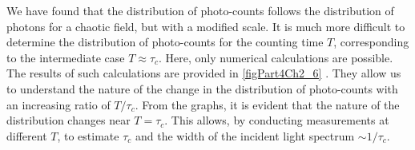 We have found that the distribution of photo-counts follows the distribution of photons for a chaotic field, but with a modified scale. It is much more difficult to determine the distribution of photo-counts for the counting time $T$, corresponding to the intermediate case $T \approx \tau_c$. Here, only numerical calculations are possible. The results of such calculations are provided in \autoref{figPart4Ch2_6} \cite{bLoudon1976}. They allow us to understand the nature of the change in the distribution of photo-counts with an increasing ratio of $T/\tau_c$. From the graphs, it is evident that the nature of the distribution changes near $T = \tau_c$. This allows, by conducting measurements at different $T$, to estimate $\tau_c$ and the width of the incident light spectrum $\sim 1/\tau_c$. 

